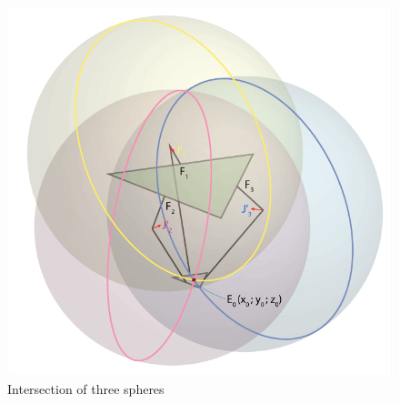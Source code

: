 \begin{figure}[H]
	\centering
	\includegraphics[width=\maxwidth{15cm}, keepaspectratio]{Chapters/Fig/intersection_of_three_spheres.png}
	\caption{Intersection of three spheres}
	\label{fig:intersection_of_three_spheres}
\end{figure}
